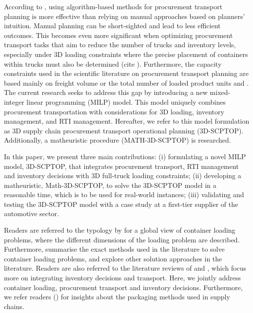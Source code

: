 According to \autocite{Diaz-Madronero2014AChain}, using algorithm-based methods for procurement transport planning is more effective than relying on manual approaches based on planners' intuition. Manual planning can be short-sighted and lead to less efficient outcomes. This becomes even more significant when optimizing procurement transport tasks that aim to reduce the number of trucks and inventory levels, especially under 3D loading constraints where the precise placement of containers within trucks must also be determined (cite ).
Furthermore, the capacity constraints used in the scientific literature on procurement transport planning are based mainly on freight volume or the total number of loaded product units  {\autocite{Hashemi-Amiri2023IntegratedApproach} and \autocite{Diaz-Madronero2014AChain}.} The current research seeks to address this gap by introducing a new mixed-integer linear programming (MILP) model. This model uniquely combines procurement transportation with considerations for 3D loading, inventory management, and RTI management. Hereafter, we refer to this model formulation as 3D supply chain procurement transport operational planning (3D-SCPTOP). Additionally,  a matheuristic procedure (MATH-3D-SCPTOP)  is researched.




In this paper, we present three main contributions: (i) formulating a novel MILP model, 3D-SCPTOP, that integrates procurement transport, RTI management and inventory decisions with 3D full-truck loading constraints; (ii)  developing a matheuristic, Math-3D-SCPTOP,  to solve the 3D-SCPTOP model in a reasonable time, which is to be used for real-world instances; (iii) validating and testing the 3D-SCPTOP model with a case study at a first-tier supplier of the automotive sector.


Readers are referred to the typology by  \autocite{Wascher2007AnProblems} for a global view of container loading problems, where the different dimensions of the loading problem are described. Furthermore, \autocite{Silva2019ExactProblems} summarise the exact methods used in the literature to solve container loading problems, and \autocite{Zhao2016INTERNATIONALAlgorithms} explore other solution approaches in the literature. Readers are also referred to the literature reviews of \autocite{Mosca2019IntegratedReview} and \autocite{Diaz-Madronero2015ADecisions}, which focus more on integrating inventory decisions and transport. Here, we jointly address container loading, procurement transport and inventory decisions. {\color{blue} Furthermore, we refer readers () for insights about the packaging methods used in supply chains.}

